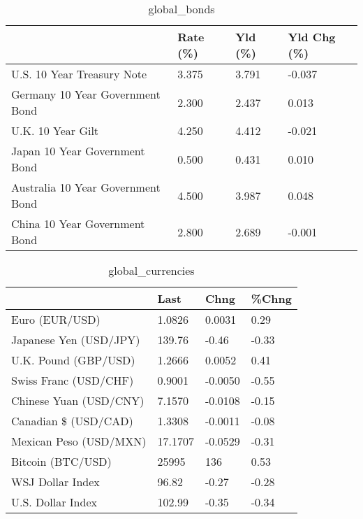 \documentclass{article}%
\begin{document}
%


\begin{table}[htbp]%
\caption{global\_bonds}%
\centering%
\begin{adjustbox}{width=1\textwidth}%
\begin{tabular}{llll}
\toprule
                                  & Rate (\%) & Yld (\%) & Yld Chg (\%) \\
\midrule
       U.S. 10 Year Treasury Note &    3.375 &   3.791 &      -0.037 \\
  Germany 10 Year Government Bond &    2.300 &   2.437 &       0.013 \\
                U.K. 10 Year Gilt &    4.250 &   4.412 &      -0.021 \\
    Japan 10 Year Government Bond &    0.500 &   0.431 &       0.010 \\
Australia 10 Year Government Bond &    4.500 &   3.987 &       0.048 \\
    China 10 Year Government Bond &    2.800 &   2.689 &      -0.001 \\
\bottomrule
\end{tabular}
%
\end{adjustbox}%
\end{table}

%


\begin{table}[htbp]%
\caption{global\_currencies}%
\centering%
\begin{adjustbox}{width=1\textwidth}%
\begin{tabular}{llll}
\toprule
                       &    Last &    Chng & \%Chng \\
\midrule
        Euro (EUR/USD) &  1.0826 &  0.0031 &  0.29 \\
Japanese Yen (USD/JPY) &  139.76 &   -0.46 & -0.33 \\
  U.K. Pound (GBP/USD) &  1.2666 &  0.0052 &  0.41 \\
 Swiss Franc (USD/CHF) &  0.9001 & -0.0050 & -0.55 \\
Chinese Yuan (USD/CNY) &  7.1570 & -0.0108 & -0.15 \\
  Canadian \$ (USD/CAD) &  1.3308 & -0.0011 & -0.08 \\
Mexican Peso (USD/MXN) & 17.1707 & -0.0529 & -0.31 \\
     Bitcoin (BTC/USD) &   25995 &     136 &  0.53 \\
      WSJ Dollar Index &   96.82 &   -0.27 & -0.28 \\
     U.S. Dollar Index &  102.99 &   -0.35 & -0.34 \\
\bottomrule
\end{tabular}
%
\end{adjustbox}%
\end{table}
\end{document}
